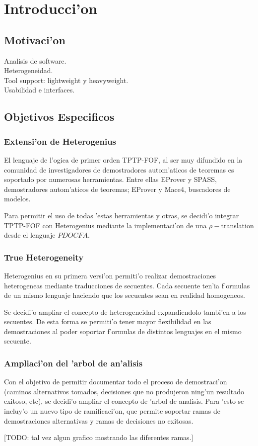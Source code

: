 \chapter{Introducci'on}
\section{Motivaci'on}

Analisis de software. \\
Heterogeneidad. \\
Tool support: lightweight y heavyweight. \\
Usabilidad e interfaces. \\

\section{Objetivos Especificos}

\subsection{Extensi'on de Heterogenius}

El lenguaje de l'ogica de primer orden TPTP-FOF, al ser muy difundido en la comunidad de investigadores de demostradores autom'aticos de teoremas es soportado por numerosas herramientas. Entre ellas EProver y SPASS, demostradores autom'aticos de teoremas; EProver y Mace4, buscadores de modelos. 

Para permitir el uso de todas 'estas herramientas y otras, se decidi'o integrar TPTP-FOF con Heterogenius mediante la implementaci'on de una $\rho-$translation desde el lenguaje $PDOCFA$.

\subsection{True Heterogeneity}

Heterogenius en su primera versi'on permiti'o realizar demostraciones heterogeneas mediante traducciones de secuentes. Cada secuente ten'ia f'ormulas de un mismo lenguaje haciendo que los secuentes sean en realidad homogeneos.

Se decidi'o ampliar el concepto de heterogeneidad expandiendolo tambi'en a los secuentes. De esta forma se permiti'o tener mayor flexibilidad en las demostraciones al poder soportar f'ormulas de distintos lenguajes en el mismo secuente.

\subsection{Ampliaci'on del 'arbol de an'alisis}

Con el objetivo de permitir documentar todo el proceso de demostraci'on (caminos alternativos tomados, decisiones que no produjeron ning'un resultado exitoso, etc), se decidi'o ampliar el concepto de 'arbol de analisis. Para 'esto se incluy'o un nuevo tipo de ramificaci'on, que permite soportar ramas de demostraciones alternativas y ramas de decisiones no exitosas.

[TODO: tal vez algun grafico mostrando las diferentes ramas.]